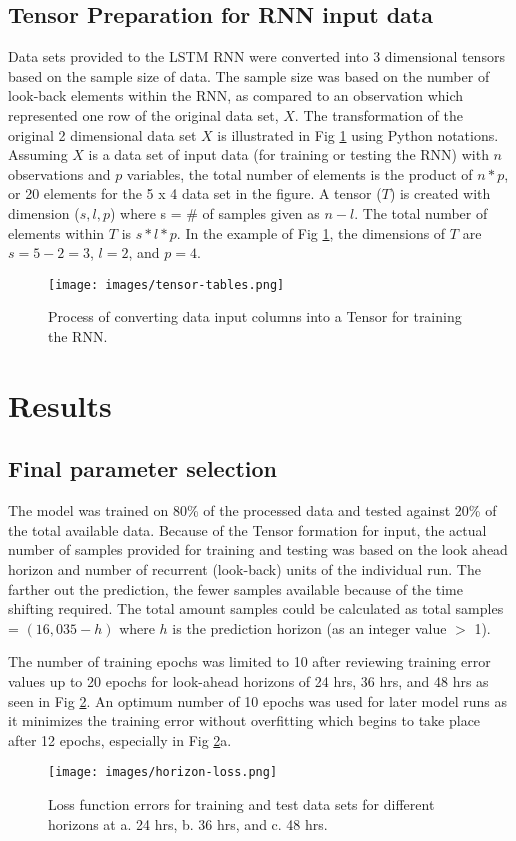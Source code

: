 \begin{linenumbers}
\subsection{Tensor Preparation for RNN input data}
Data sets provided to the LSTM RNN were converted into 3 dimensional tensors based on the sample size of data. The sample size was based on the number of look-back elements within the RNN, as compared to an observation which represented one row of the original data set, $X$.  The transformation of the original 2 dimensional data set $X$ is illustrated in Fig \ref{fig:tensor-tables} using Python notations. Assuming $X$ is a data set of input data (for training or testing the RNN) with $n$ observations and $p$ variables, the total number of elements is the product of $n * p$, or 20 elements for the 5 x 4 data set in the figure. A tensor ($T$) is created with dimension ($s, l, p$) where s = \# of samples given as $n - l$. The total number of elements within $T$ is $s*l*p$. In the example of Fig \ref{fig:tensor-tables}, the dimensions of $T$ are $s = 5 - 2 = 3$, $l = 2$, and $p = 4$.    
%
\begin{figure}
\centering
\texttt{[image: images/tensor-tables.png]}  %
\caption{Process of converting data input columns into a Tensor for training the RNN.}
\label{fig:tensor-tables}
\end{figure}
%

\section{Results}
\subsection{Final parameter selection}
The model was trained on 80\% of the processed data and tested against 20\% of the total available data. Because of the Tensor formation for input, the actual number of samples provided for training and testing was based on the look ahead horizon and number of recurrent (look-back) units of the individual run. The farther out the prediction, the fewer samples available because of the time shifting required. The total amount samples could be calculated as total samples = $(16,035 - h)$ where $h$ is the prediction horizon (as an integer value $>$ 1). 

The number of training epochs was limited to 10 after reviewing training error values up to 20 epochs for look-ahead horizons of 24 hrs, 36 hrs, and 48 hrs as seen in Fig \ref{fig:horizon-loss}. An optimum number of 10 epochs was used for later model runs as it minimizes the training error without overfitting which begins to take place after 12 epochs, especially in Fig \ref{fig:horizon-loss}a. 
%
\begin{figure}
\centering
\texttt{[image: images/horizon-loss.png]}  %
\caption[Loss function errors of training and test data sets]{Loss function errors for training and test data sets for different horizons at a. 24 hrs, b. 36 hrs, and c. 48 hrs.}
\label{fig:horizon-loss}
\end{figure}
%


\end{linenumbers}
